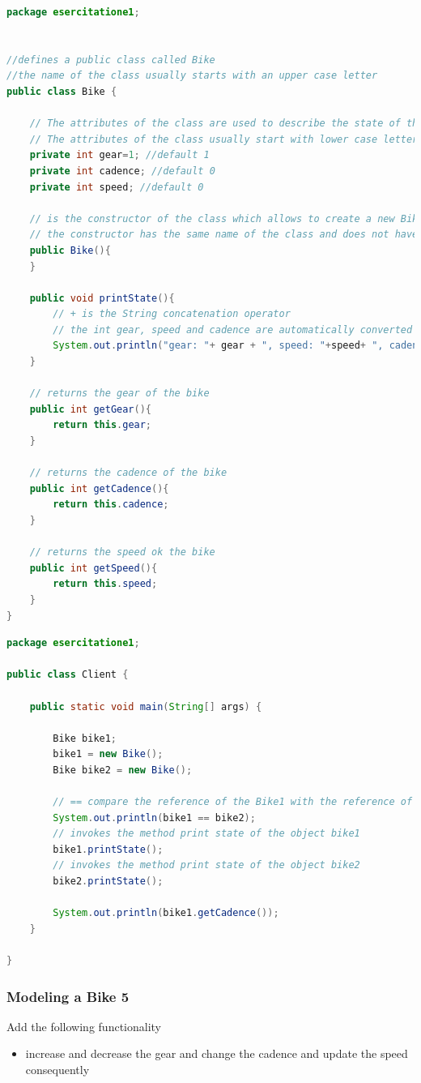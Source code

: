 \documentclass{article}
\theoremstyle{definition}
\begin{document}
\begin{lstlisting}[language=Java,escapechar=|]
package esercitatione1;


//defines a public class called Bike 
//the name of the class usually starts with an upper case letter
public class Bike {
	
	// The attributes of the class are used to describe the state of the class and are usually private or protected 
	// The attributes of the class usually start with lower case letters
	private int gear=1; //default 1
	private int cadence; //default 0
	private int speed; //default 0
	
	// is the constructor of the class which allows to create a new Bike
	// the constructor has the same name of the class and does not have a return type
	public Bike(){
	}
	
	public void printState(){
	    // + is the String concatenation operator
	    // the int gear, speed and cadence are automatically converted into String
		System.out.println("gear: "+ gear + ", speed: "+speed+ ", cadence: "+cadence);
	}
	
	// returns the gear of the bike
	public int getGear(){
		return this.gear;
	}

	// returns the cadence of the bike
	public int getCadence(){
		return this.cadence;
	}
	
	// returns the speed ok the bike
	public int getSpeed(){
		return this.speed;
	}
}
\end{lstlisting}


\begin{lstlisting}[language=Java,escapechar=|]
package esercitatione1;

public class Client {

	public static void main(String[] args) {

		Bike bike1;
		bike1 = new Bike();
		Bike bike2 = new Bike();

		// == compare the reference of the Bike1 with the reference of the Bike2
		System.out.println(bike1 == bike2);
		// invokes the method print state of the object bike1
		bike1.printState();
		// invokes the method print state of the object bike2
		bike2.printState();

		System.out.println(bike1.getCadence());
	}

}

\end{lstlisting}


\subsubsection{Modeling a Bike 5}
Add the following functionality
\begin{itemize}
\item increase and decrease the gear and change the cadence and update the speed consequently
\end{itemize}
\end{document}
